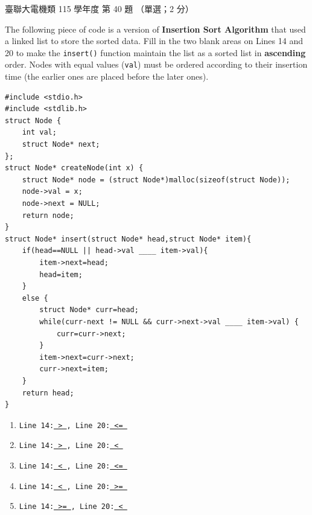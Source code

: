 \begin{pastexam}[label={px:ust-115-ee-ds-40}]{臺聯大電機類 115 學年度 第 40 題}
（單選；2 分）

The following piece of code is a version of \textbf{Insertion Sort Algorithm} that used a linked
list to store the sorted data. Fill in the two blank areas on Lines 14 and 20 to make the
\texttt{insert()} function maintain the list as a sorted list in \textbf{ascending} order. Nodes
with equal values (\texttt{val}) must be ordered according to their insertion time (the earlier
ones are placed before the later ones).
\begin{verbatim}
#include <stdio.h>
#include <stdlib.h>
struct Node {
    int val;
    struct Node* next;
};
struct Node* createNode(int x) {
    struct Node* node = (struct Node*)malloc(sizeof(struct Node));
    node->val = x;
    node->next = NULL;
    return node;
}
struct Node* insert(struct Node* head,struct Node* item){
    if(head==NULL || head->val ____ item->val){
        item->next=head;
        head=item;
    }
    else {
        struct Node* curr=head;
        while(curr-next != NULL && curr->next->val ____ item->val) {
            curr=curr->next;
        }
        item->next=curr->next;
        curr->next=item;
    }
    return head;
}
\end{verbatim}
\begin{enumerate}[label=(\Alph*)]
\item \texttt{Line 14:\underline{ > }, Line 20:\underline{ <= }}
\item \texttt{Line 14:\underline{ > }, Line 20:\underline{ < }}
\item \texttt{Line 14:\underline{ < }, Line 20:\underline{ <= }}
\item \texttt{Line 14:\underline{ < }, Line 20:\underline{ >= }}
\item \texttt{Line 14:\underline{ >= }, Line 20:\underline{ < }}
\end{enumerate}
\end{pastexam}

